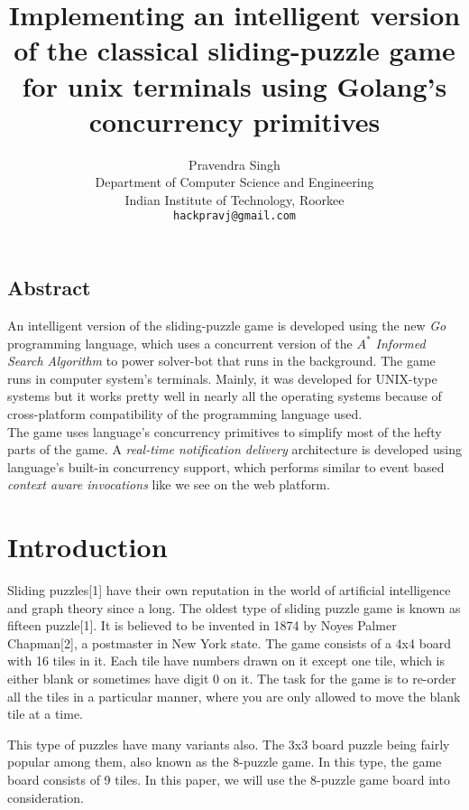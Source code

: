 \documentclass[a4paper]{article}
\title{Implementing an intelligent version of the classical sliding-puzzle game for unix terminals using Golang's concurrency primitives}
\author{\Large{Pravendra Singh}\\
	Department of Computer Science and Engineering\\
	Indian Institute of Technology, Roorkee\\
	\texttt{hackpravj@gmail.com}}
\begin{document}
\maketitle

\begin{center}
\section*{\large{Abstract}}
\end{center}

\textrm{\normalsize{An intelligent version of the sliding-puzzle game is developed using the new \textit{Go} programming language, which uses a concurrent version of the \textit{$A^{*}$ Informed Search Algorithm} to power solver-bot that runs in the background. The game runs in computer system's terminals. Mainly, it was developed for UNIX-type systems but it works pretty well in nearly all the operating systems because of cross-platform compatibility of the programming language used.\\
 The game uses language's concurrency primitives to simplify most of the hefty parts of the game. A \textit{real-time notification delivery} architecture is developed using language's built-in concurrency support, which performs similar to event based \textit{context aware invocations} like we see on the web platform.\\}}

\section{Introduction}

\textrm{\normalsize{Sliding puzzles[1] have their own reputation in the world of artificial intelligence and graph theory
since a long. The oldest type of sliding puzzle game is known as fifteen puzzle[1]. It is believed to be
invented in 1874 by Noyes Palmer Chapman[2], a postmaster in New York state. The game consists
of a 4x4 board with 16 tiles in it. Each tile have numbers drawn on it except one tile, which is either
blank or sometimes have digit 0 on it. The task for the game is to re-order all the tiles in a
particular manner, where you are only allowed to move the blank tile at a time.\\}}

\textrm{\normalsize{This type of puzzles have many variants also. The 3x3 board puzzle being fairly popular among
them, also known as the 8-puzzle game. In this type, the game board consists of 9 tiles. In this
paper, we will use the 8-puzzle game board into consideration.\\}}
\end{document}
